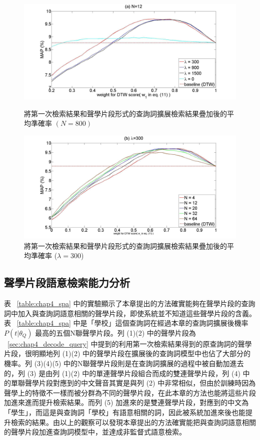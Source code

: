 \begin{figure}
\centering
\includegraphics[scale=0.18]{images/chap4_resulta.jpg}
\caption{將第一次檢索結果和聲學片段形式的查詢詞擴展檢索結果疊加後的平均準確率 $(N = 800)$} \label{fig:chap4_resulta}
\centering
\includegraphics[scale=0.18]{images/chap4_resultb.jpg}
\caption{將第一次檢索結果和聲學片段形式的查詢詞擴展檢索結果疊加後的平均準確率 ($\lambda = 300$)} \label{fig:chap4_resultb}
\end{figure}


\subsection{聲學片段語意檢索能力分析}
表 ~\ref{table:chap4_spa} 中的實驗顯示了本章提出的方法確實能夠在聲學片段的查詢詞中加入與查詢詞語意相關的聲學片段，即使系統並不知道這些聲學片段的含義。表 ~\ref{table:chap4_spa} 中是「學校」這個查詢詞在經過本章的查詢詞擴展後機率 $P(t|\theta_Q)$ 最高的五個N聯聲學片段。列 (1)(2) 中的聲學片段為 ~\ref{sec:chap4_decode_query}
中提到的利用第一次檢索結果得到的原查詢詞的聲學片段，很明顯地列 (1)(2) 中的聲學片段在擴展後的查詢詞模型中也佔了大部分的機率。列 (3)(4)(5) 中的N聯聲學片段則是在查詢詞擴展的過程中被自動加進去的，列 (3) 是由列 (1)(2) 中的單連聲學片段組合而成的雙連聲學片段，列 (4) 中的單聯聲學片段對應到的中文聲音其實是與列 (2) 中非常相似，但由於訓練時因為聲學上的特徵不一樣而被分群為不同的聲學片段，在此本章的方法也能將這些片段加進來進而提升檢索結果。而列 (5) 加進來的是雙連聲學片段，對應到的中文為「學生」，而這是與查詢詞「學校」有語意相關的詞，因此被系統加進來後也能提升檢索的結果。由以上的觀察可以發現本章提出的方法確實能把與查詢詞語意相關的聲學片段加進查詢詞模型中，並達成非監督式語意檢索。

